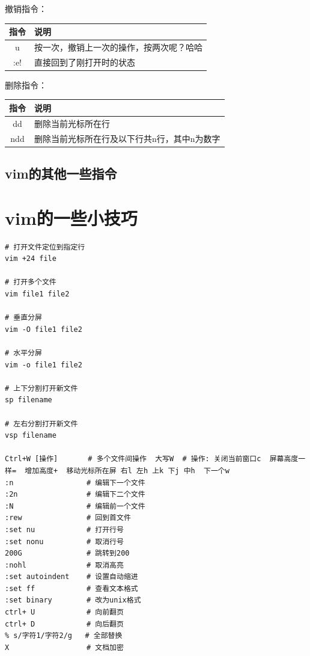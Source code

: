撤销指令：

\begin{table}[h]
  \begin{center}
    \begin{tabular}{cl}
      \hline
      指令  & 说明 \\
      \hline
      u    & 按一次，撤销上一次的操作，按两次呢？哈哈 \\
      \hline
      :e!  & 直接回到了刚打开时的状态 \\
      \hline
    \end{tabular}
  \end{center}
\end{table}

删除指令：

\begin{table}[h]
  \begin{center}
    \begin{tabular}{cl}
      \hline
      指令   & 说明 \\
      \hline
      dd    & 删除当前光标所在行 \\
      \hline
      ndd   & 删除当前光标所在行及以下行共n行，其中n为数字 \\
      \hline
    \end{tabular}
  \end{center}
\end{table}

\subsection{vim的其他一些指令}

\section{vim的一些小技巧}

\begin{verbatim}
# 打开文件定位到指定行
vim +24 file       

# 打开多个文件	
vim file1 file2    

# 垂直分屏
vim -O file1 file2 

# 水平分屏
vim -o file1 file2 

# 上下分割打开新文件
sp filename       

# 左右分割打开新文件 
vsp filename      

Ctrl+W [操作]       # 多个文件间操作  大写W  # 操作: 关闭当前窗口c  屏幕高度一样=  增加高度+  移动光标所在屏 右l 左h 上k 下j 中h  下一个w  
:n                 # 编辑下一个文件
:2n                # 编辑下二个文件
:N                 # 编辑前一个文件
:rew               # 回到首文件
:set nu            # 打开行号
:set nonu          # 取消行号
200G               # 跳转到200
:nohl              # 取消高亮
:set autoindent    # 设置自动缩进
:set ff            # 查看文本格式
:set binary        # 改为unix格式
ctrl+ U            # 向前翻页
ctrl+ D            # 向后翻页
% s/字符1/字符2/g   # 全部替换	
X                  # 文档加密
\end{verbatim}

